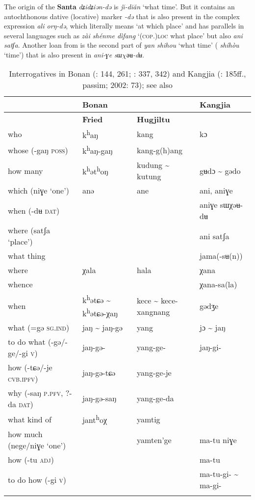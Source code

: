\largerpage[-1]
The origin of the \textbf{Santa}  \textit{dʑidʑiən-də} is  \textit{j\u{\i}-diăn} ‘what time’. But it contains an autochthonous dative (locative) marker \textit{-d}\textit{ə} that is also present in the complex expression \textit{ali orŋ}\textit{-d}\textit{ə}, which literally means ‘at which place’ and has parallels in several languages such as   \textit{zài shénme dìfang} ‘(\textsc{cop}.)\textsc{loc} what place’ but also  \textit{ani satʃa}. Another loan from  is the second part of \textit{yan shihou} ‘what time’ ( \textit{shíhòu} ‘time’) that is also present in  \textit{ani-ɣe sɯ$\chi əʉ$-dʉ}.

\begin{table}
\caption{Interrogatives in Bonan (\citealt{Fried2010}: 144, 261; \citealt{WuHugjiltu2003}: 337, 342) and Kangjia (\citealt{Siqinchaoketu1999}: 185ff., passim; 2002: 73); see also \citet[187]{Todaeva1963}}
\label{tab:mong:24}

\begin{tabularx}{\textwidth}{lQQl}
\lsptoprule
& \textbf{Bonan} &  & \textbf{Kangjia}\\
\midrule
& \textbf{Fried} & \textbf{Hugjiltu} & \\
\midrule
who & k\textsuperscript{h}aŋ & kang & kɔ\\
whose (-gaŋ \textsc{poss}) & k\textsuperscript{h}aŋ-gaŋ & kang-g(h)ang & \\
how many & k\textsuperscript{h}ət\textsuperscript{h}oŋ & kudung {\textasciitilde} kutung & gʉdɔ {\textasciitilde} gədo\\
which (niɣe ‘one’) & anə & ane & ani, aniɣe\\
when (-dʉ \textsc{dat}) &  &  & aniɣe sɯχəʉ-dʉ\\
where (satʃa ‘place’) &  &  & ani satʃa\\
what thing &  &  & jama(-sʉ(n))\\
where & χala & hala & χana\\
whence &  &  & χana-sa(la)\\
when & k\textsuperscript{h}ətɕə {\textasciitilde} k\textsuperscript{h}ətɕə-χaŋ & kece {\textasciitilde} kece-xangnang & gədʒe\\
what (=gə \textsc{sg}.\textsc{ind}) & jaŋ {\textasciitilde} jaŋ-gə & yang & jɔ {\textasciitilde} jaŋ\\
to do what (-gə/-ge/-gi \textsc{v}) & jaŋ-gə- & yang-ge- & jaŋ-gi-\\
how (-tɕə/-je \textsc{cvb.ipfv}) & jaŋ-gə-tɕə & yang-ge-je & \\
why (-saŋ \textsc{p.pfv}, ?-da \textsc{dat}) & jaŋ-gə-saŋ & yang-ge-da & \\
what kind of & jant\textsuperscript{h}oχ & yamtig & \\
how much (nege/niɣe ‘one’) &  & yamten’ge & ma-tu niɣe\\
how (-tu \textsc{adj}) &  &  & ma-tu\\
to do how (-gi \textsc{v}) &  &  & ma-tu-gi- {\textasciitilde} ma-gi-\\
\lspbottomrule
\end{tabularx}
\end{table}

